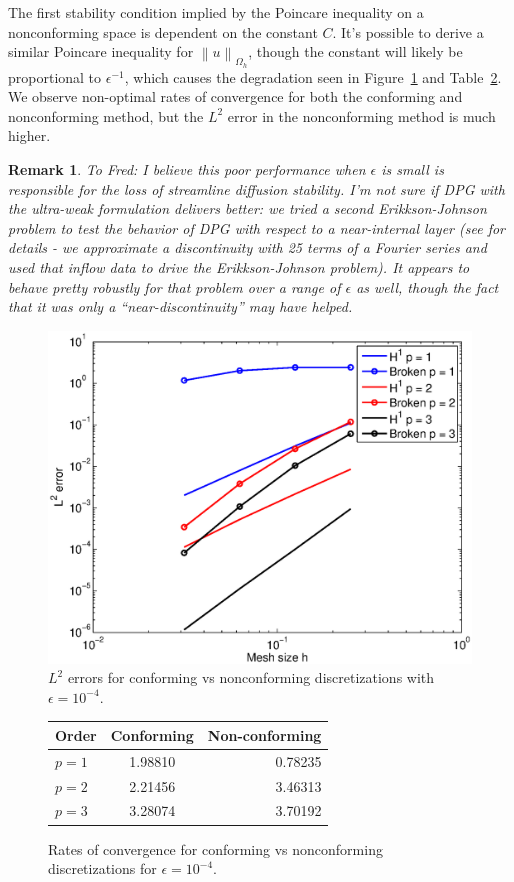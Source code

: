 \documentclass[final,leqno]{siamltex}
\newcommand{\nor}[1]{\left\| #1 \right\|}
\newcommand{\Oh}{\Omega_h}
\newtheorem{remark}{Remark}
\begin{document}
The first stability condition implied by the Poincare inequality on a nonconforming space is dependent on the constant $C$.  It's possible to derive a similar Poincare inequality for $\nor{u}_{\Oh}$, though the constant will likely be proportional to $\epsilon^{-1}$, which causes the degradation seen in Figure~\ref{fig:aniso_poisson} and Table~\ref{tab:aniso_poisson}.  We observe non-optimal rates of convergence for both the conforming and nonconforming method, but the $L^2$ error in the nonconforming method is much higher.

\begin{remark}
To Fred: I believe this poor performance when $\epsilon$ is small is responsible for the loss of streamline diffusion stability.  I'm not sure if DPG with the ultra-weak formulation delivers better: we tried a second Erikkson-Johnson problem to test the behavior of DPG with respect to a near-internal layer (see \cite{DPGrobustness2,DPGrobustness} for details - we approximate a discontinuity with 25 terms of a Fourier series and used that inflow data to drive the Erikkson-Johnson problem).  It appears to behave pretty robustly for that problem over a range of $\epsilon$ as well, though the fact that it was only a ``near-discontinuity'' may have helped.  
\end{remark}

\begin{figure}
\centering
\includegraphics[width=.6\textwidth]{figs/aniso_poisson_rates.eps}
  \caption{$L^2$ errors for conforming vs nonconforming discretizations with $\epsilon = 10^{-4}$.}
  \label{fig:aniso_poisson}
\end{figure}

\begin{figure}
\centering
  \begin{tabular}{| l || c | r |}
   \hline
    Order & Conforming & Non-conforming\\
    \hline
    $p=1$ & 1.98810 &  0.78235\\ \hline
    $p=2$ & 2.21456 & 3.46313\\ \hline
    $p=3$ & 3.28074 & 3.70192\\
    \hline
  \end{tabular}
  \caption{Rates of convergence for conforming vs nonconforming discretizations for $\epsilon = 10^{-4}$.}
  \label{tab:aniso_poisson}
\end{figure}
\end{document}

